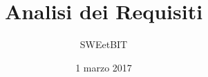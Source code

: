 



\title{\textbf{Analisi dei Requisiti}}
\author{SWEetBIT}

\date{1 marzo 2017}




\makeFrontPage

\tableofcontents




